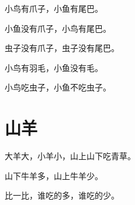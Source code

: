 \documentclass[12pt,UTF-8,openany]{ctexbook}
\begin{document}
\begin{large}
    
    小鸟有爪子，小鱼有尾巴。
    
    小鱼没有爪子，小鸟有尾巴。
    
    虫子没有爪子，虫子没有尾巴。
    
    小鸟有羽毛，小鱼没有毛。
    
    小鸟吃虫子，小鱼不吃虫子。
    
\end{large}


\clearpage

\begin{center}
    
\end{center}


\hanzibox{}\hanzibox{}\hanzibox{}\hanzibox{}\hspace{1em}\hanzibox{}\hanzibox{}\hanzibox{}\hanzibox{}

\hanzibox{}\hanzibox{}\hanzibox{}\hanzibox{}\hspace{1em}\hanzibox{}\hanzibox{}\hanzibox{}\hanzibox{}

\hanzibox{}\hanzibox{}\hanzibox{}\hanzibox{}\hspace{1em}\hanzibox{}\hanzibox{}\hanzibox{}\hanzibox{}

\hanzibox{}\hanzibox{}\hanzibox{}\hanzibox{}\hspace{1em}




\chapter{山羊}

\begin{large}
    
    大羊大，小羊小，山上山下吃青草。
    
    山下牛羊多，山上牛羊少。
    
    比一比，谁吃的多，谁吃的少。
    
\end{large}


\clearpage

\begin{center}
    
\end{center}
\end{document}
